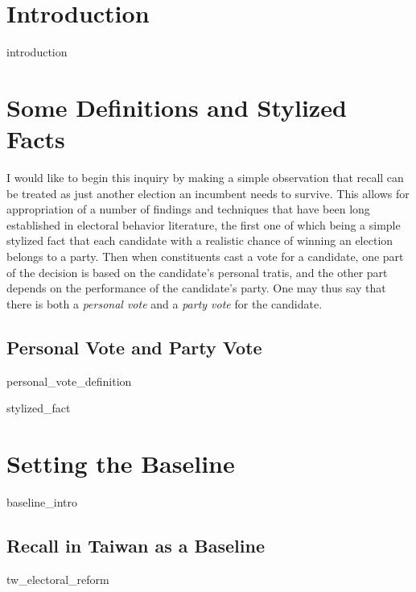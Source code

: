 \documentclass[hyphens, crop=false]{standalone}
\begin{document}
	
	\section*{Introduction}
		{introduction}
	
	\section*{Some Definitions and Stylized Facts}
		I would like to begin this inquiry by making a simple observation that
		recall can be treated as just another election
		an incumbent needs to survive.
		This allows for appropriation of a number of findings and techniques
		that have been long established in electoral behavior literature,
		the first one of which being a simple stylized fact that
		each candidate with a realistic chance of winning an election belongs to a party.
		Then when constituents cast a vote for a candidate,
		one part of the decision is based on the candidate's personal tratis,
		and the other part depends on the performance of the candidate's party. 
		One may thus say that there is both
		a \textit{personal vote}
		and a \textit{party vote} for the candidate.
	
		\subsection*{Personal Vote and Party Vote}
			{personal_vote_definition}
			
			{stylized_fact}
				
	\section*{Setting the Baseline}
		
		{baseline_intro}
		
		
		\subsection*{Recall in Taiwan as a Baseline}
		
			{tw_electoral_reform}
			
			
	
\end{document}
